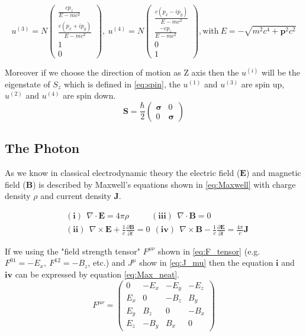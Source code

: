 \begin{equation}
u^{(3)}=N\begin{pmatrix} \frac{cp_{z}}{E-mc^{2}} \\ \frac{c(p_{x}+ip_{y})}{E-mc^{2}} \\ 1 \\ 0 \end{pmatrix},~
u^{(4)}=N\begin{pmatrix} \frac{c(p_{x}-ip_{y})}{E-mc^{2}} \\ \frac{-cp_{z}}{E-mc^{2}} \\ 0 \\ 1 \end{pmatrix}, \mathrm{with}~E=-\sqrt{m^{2}c^{4}+\mathbf{p}^{2}c^{2}}
\label{eq:plane_wave_s5}
\end{equation}

Moreover if we choose the direction of motion as Z axis then the $u^{(i)}$ will be the eigenstate of $S_{z}$ which is defined in \ref{eq:spin}, the $u^{(1)}$ and $ u^{(3)}$ are spin up, $u^{(2)}$ and $ u^{(4)}$ are spin down.
\begin{equation}
\mathbf{S}=\frac{\hbar}{2}\begin{pmatrix} \pmb{\sigma} & 0\\ 0 & \pmb{\sigma}\end{pmatrix}
\label{eq:spin}
\end{equation}

\subsection{The Photon}\label{subsec:Photon}
As we know in classical electrodynamic theory the electric field ($\mathbf{E}$) and magnetic field ($\mathbf{B}$) is described by Maxwell's equations shown in \ref{eq:Maxwell} with charge density $\rho$ and current density $\mathbf{J}$.

\begin{equation}
\begin{split}
&(\mathbf{i})~~\nabla\cdot \mathbf{E}=4\pi\rho ~~~~~~~~~~~~ (\mathbf{iii})~~\nabla\cdot \mathbf{B}=0 \\
&(\mathbf{ii})~~\nabla\times\mathbf{E}+\frac{1}{c}\frac{\partial\mathbf{B}}{\partial t}=0 ~~(\mathbf{iv})~~\nabla\times\mathbf{B}-\frac{1}{c}\frac{\partial\mathbf{E}}{\partial t}=\frac{4\pi}{c}\mathbf{J}
\end{split}
\label{eq:Maxwell}
\end{equation}

If we using the "field strength tensor" $F^{\mu\nu}$ shown in \ref{eq:F_tensor} (e.g. $F^{01}=-E_{x}, ~F^{12}=-B_{z}$, etc.) and $J^{\mu}$ show in \ref{eq:J_mu} then the equation $\mathbf{i}$ and $\mathbf{iv}$ can be expressed by equation \ref{eq:Max_neat}.
\begin{equation}
F^{\mu\nu}=\begin{pmatrix} 0 & -E_{x} & -E_{y} & -E_{z}\\ E_{x} & 0 & -B_{z} & B_{y} \\ E_{y} & B_{z} & 0 & -B_{x} \\ E_{z} & -B_{y} & B_{x} & 0\end{pmatrix}
\label{eq:F_tensor}
\end{equation}

